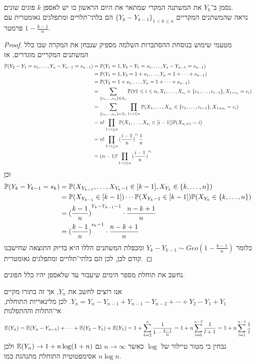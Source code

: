\subquestion{}
נסמן ב־$Y_k$ את המשתנה המקרי שמתאר את היום הראשון בו יש לאספן $k$ פוגים שונים. \\
נראה שהמשתנים המקריים ${\{Y_k - Y_{k - 1}\}}_{1 < k \le n}$ הם בלתי־תלויים ומתפלגים גאומטרית עם פרמטר $1 - \frac{k - 1}{n}$.
\begin{proof}
	מטעמי שימוש בנוסחת ההסתברות השלמה מספיק שנבחן את המקרה שבו כלל המשתנים המקריים מוגדרים, אז
	\begin{align*}
		\mathbb{P}(Y_2 - Y_1 = s_1, \dots, Y_n - Y_{n - 1} = s_{n - 1})
		& = \mathbb{P}(Y_1 = 1, Y_2 - Y_1 = s_1, \dots, Y_n - Y_{n - 1} = s_{n - 1}) \\
		& = \mathbb{P}(Y_1 = 1, Y_2 = 1 + s_1, \dots, Y_n = 1 + \cdots + s_{n - 1}) \\
		& = \mathbb{P}(Y_2 = 1 + s_1, \dots, Y_n = 1 + \cdots + s_{n - 1}) \\
		& = \sum_{\{c_1, \dots, c_n\} \in S_n} \mathbb{P}(\forall 1 \le i \le n, X_1, \dots, X_{s_i} \in \{c_1, \dots, c_{i - 1}\}, X_{1 + s_i} = c_i) \\
		& = \sum_{\{c_1, \dots, c_n\} \in S_n} \prod_{1 < i \le n} \mathbb{P}(X_1, \dots, X_{s_i} \in \{c_1, \dots, c_{i - 1}\}, X_{1 + s_i} = c_i) \\
		& = n! \prod_{1 < i \le n} \mathbb{P}(X_1, \dots, X_{s_i} \in [i - 1]) \mathbb{P}(X_{s_i + 1} = i) \\
		& = n! \prod_{1 < i \le n} {(\frac{i - 1}{n})}^{s_i} \frac{1}{n} \\
		& = (n - 1)! \prod_{1 < i \le n} {(\frac{i - 1}{n})}^{s_i}
	\end{align*}
	וכן
	\begin{align*}
		\mathbb{P}(Y_k - Y_{k - 1} = s_k)
		& = \mathbb{P}(X_{Y_{k - 1}}, \dots, X_{Y_k - 1} \in [k - 1], X_{Y_k} \in \{k, \dots, n\}) \\
		& = \mathbb{P}(X_{Y_{k - 1}} \in [k - 1]) \cdots \mathbb{P}(X_{Y_k - 1} \in [k - 1]) \mathbb{P}(X_{Y_k} \in \{k, \dots, n\}) \\
		& = {(\frac{k - 1}{n})}^{Y_k - Y_{k - 1} - 1} \cdot \frac{n - k + 1}{n} \\
		& = {(\frac{k - 1}{n})}^{s_k - 1} \cdot \frac{n - k + 1}{n}
	\end{align*}
	כלומר $Y_k - Y_{k - 1} \sim Geo(1 - \frac{k - 1}{n})$ ומכפלת המשתנים הללו היא בדיוק התוצאה שחישבנו קודם לכן, לכן הם בלתי־תלויים ומתפלגים גאומטרית.
\end{proof}

\subquestion{}
נחשב את תוחלת מספר הימים שיעבור עד שלאספן יהיו כלל הפוגים.
\begin{solution}
	אנו רוצים לחשב את $Y_n$, אך זה בתורו מקיים $Y_n = Y_n - Y_{n - 1} + Y_{n - 1} - Y_{n - 2} + \cdots + Y_2 - Y_1 + Y_1$.
	לכן מלינאריות התוחלת, אי־התלות וההתפלגות
	\[
		\mathbb{E}(Y_n)
		= \mathbb{E}(Y_n - Y_{n - 1}) + \cdots + \mathbb{E}(Y_2 - Y_1) + \mathbb{E}(Y_1)
		= 1 + \sum_{k = 2}^{n} \frac{1}{1 - \frac{k - 1}{n}}
		= 1 + n \sum_{l = 0}^{n - 2} \frac{1}{l + 1}
		= 1 + n \sum_{l = 1}^{n - 1} \frac{1}{l}
	\]
	נבחין כי מטור טיילור של $\log$ כאשר $n \to \infty$ גם $\mathbb{E}(Y_n) \to 1 + n \log(1 + n)$ ולכן אסימפטוטית התוחלת מתנהגת כמו $n \log n$.
\end{solution}

